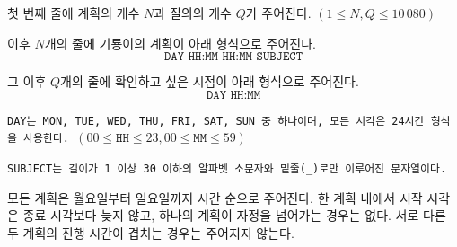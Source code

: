 첫 번째 줄에 계획의 개수 $N$과 질의의 개수 $Q$가 주어진다. $(1 \le N, Q \le 10\,080)$

이후 $N$개의 줄에 기룡이의 계획이 아래 형식으로 주어진다.
$$\texttt{DAY HH:MM HH:MM SUBJECT}$$

그 이후 $Q$개의 줄에 확인하고 싶은 시점이 아래 형식으로 주어진다.
$$\texttt{DAY HH:MM}$$

\tt{DAY}는 \tt{MON}, \tt{TUE}, \tt{WED}, \tt{THU}, \tt{FRI}, \tt{SAT}, \tt{SUN} 중 하나이며, 모든 시각은 24시간 형식을 사용한다. $(00 \le \texttt{HH} \le 23, 00 \le \texttt{MM} \le 59)$

\tt{SUBJECT}는 길이가 1 이상 30 이하의 알파벳 소문자와 밑줄(\_)로만 이루어진 문자열이다.

모든 계획은 월요일부터 일요일까지 시간 순으로 주어진다. 한 계획 내에서 시작 시각은 종료 시각보다 늦지 않고, 하나의 계획이 자정을 넘어가는 경우는 없다. 서로 다른 두 계획의 진행 시간이 겹치는 경우는 주어지지 않는다.